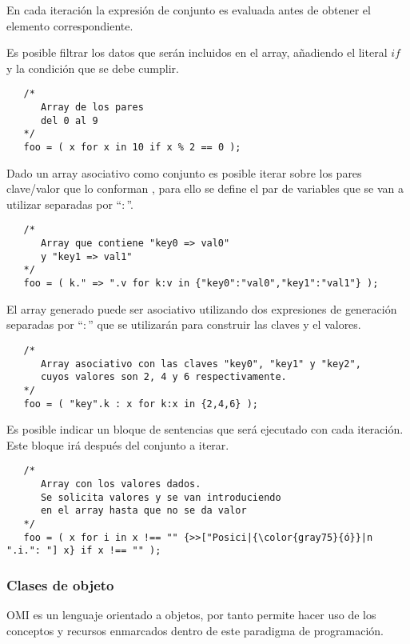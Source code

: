 En cada iteración la expresión de conjunto es evaluada antes de obtener el elemento correspondiente.

Es posible filtrar los datos que serán incluidos en el array, añadiendo el literal
$if$ y la condición que se debe cumplir. \\

\begin{lstlisting}
   /*
      Array de los pares
      del 0 al 9
   */
   foo = ( x for x in 10 if x % 2 == 0 );
\end{lstlisting}

Dado un array asociativo como conjunto es posible iterar sobre los pares clave/valor que lo conforman ,
para ello se define el par de variables que se van a utilizar separadas por ``$:$''. \\

\begin{lstlisting}
   /*
      Array que contiene "key0 => val0"
      y "key1 => val1"
   */
   foo = ( k." => ".v for k:v in {"key0":"val0","key1":"val1"} );
\end{lstlisting}

El array generado puede ser asociativo utilizando dos expresiones de generación separadas por 
``$:$'' que se utilizarán para construir las claves y el valores. \\

\begin{lstlisting}
   /*
      Array asociativo con las claves "key0", "key1" y "key2",
      cuyos valores son 2, 4 y 6 respectivamente.
   */
   foo = ( "key".k : x for k:x in {2,4,6} );
\end{lstlisting}

Es posible indicar un bloque de sentencias que será ejecutado 
con cada iteración. Este bloque irá después del conjunto a iterar. \\

\begin{lstlisting}
   /*
      Array con los valores dados.
      Se solicita valores y se van introduciendo
      en el array hasta que no se da valor 
   */
   foo = ( x for i in x !== "" {>>["Posici|{\color{gray75}{ó}}|n ".i.": "] x} if x !== "" );
\end{lstlisting}


\subsubsection{Clases de objeto} \label{sec:class}
OMI es un lenguaje orientado a objetos, por tanto permite hacer uso de los conceptos y recursos enmarcados
dentro de este paradigma de programación.

